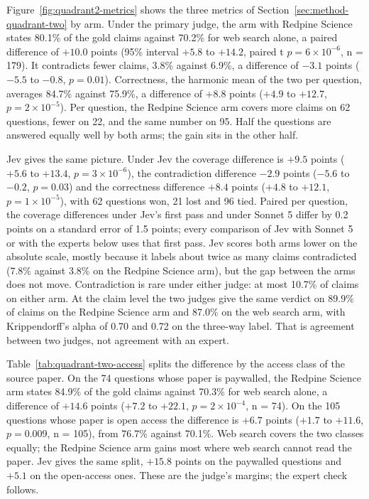 \documentclass[sn-mathphys,Numbered]{sn-jnl}%
\begin{document}
Figure~\ref{fig:quadrant2-metrics} shows the three metrics of
Section~\ref{sec:method-quadrant-two} by arm. Under the primary judge, the arm
with Redpine Science states 80.1\% of the gold claims against 70.2\% for web
search alone, a paired difference of $+10.0$ points (95\% interval $+5.8$ to $+14.2$,
paired t $p = 6\times10^{-6}$, n = 179). It contradicts fewer claims, 3.8\% against
6.9\%, a difference of $-3.1$ points ($-5.5$ to $-0.8$, $p = 0.01$). Correctness,
the harmonic mean of the two per question, averages 84.7\% against 75.9\%, a difference of $+8.8$ points ($+4.9$ to $+12.7$,
$p = 2\times10^{-5}$). Per question, the Redpine Science arm covers more claims on 62
questions, fewer on 22, and the same number on 95. Half the questions are answered
equally well by both arms; the gain sits in the other half.

Jev gives the same picture. Under Jev the coverage difference is
$+9.5$ points ($+5.6$ to $+13.4$, $p = 3\times10^{-6}$), the contradiction difference
$-2.9$ points ($-5.6$ to $-0.2$, $p = 0.03$) and the correctness difference $+8.4$ points
($+4.8$ to $+12.1$, $p = 1\times10^{-5}$), with 62 questions won, 21 lost and 96 tied.
Paired per question, the coverage differences under Jev's first pass and under Sonnet 5
differ by 0.2 points on a standard error of 1.5 points; every comparison of Jev with Sonnet 5
or with the experts below uses that first pass. Jev scores both arms lower on the absolute scale,
mostly because it labels about twice as many claims contradicted (7.8\% against
3.8\% on the Redpine Science arm), but the gap between the arms does not move.
Contradiction is rare under either judge: at most 10.7\% of claims on either arm.
At the claim level the two judges give the same verdict on 89.9\% of claims on the
Redpine Science arm and 87.0\% on the web search arm, with Krippendorff's alpha
of 0.70 and 0.72 on the three-way label. That is agreement between two judges, not
agreement with an expert.

Table~\ref{tab:quadrant-two-access} splits the difference by the access class of the
source paper. On the
74 questions whose paper is paywalled, the Redpine Science arm states 84.9\% of the
gold claims against 70.3\% for web search alone, a difference of $+14.6$ points ($+7.2$ to
$+22.1$, $p = 2\times10^{-4}$, n = 74). On the 105 questions whose paper is open access
the difference is $+6.7$ points ($+1.7$ to $+11.6$, $p = 0.009$, n = 105), from 76.7\%
against 70.1\%. Web search covers the two classes equally; the Redpine Science arm gains
most where web search cannot read the paper. Jev gives the same split, $+15.8$ points on the
paywalled questions and $+5.1$ on the open-access ones. These are the judge's margins;
the expert check follows.
\end{document}
